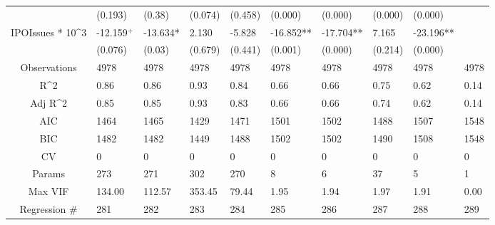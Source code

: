 \documentclass{article}
\begin{document}
\begin{table}[H]
\begin{tabular}{|clllllllll|}
   & (0.193) & (0.38) & (0.074) & (0.458) & (0.000) & (0.000) & (0.000) & (0.000) &  \\ 
  IPOIssues * 10^3 & -12.159$^{+}$ & -13.634* & 2.130 & -5.828 & -16.852** & -17.704** & 7.165 & -23.196** &  \\ 
   & (0.076) & (0.03) & (0.679) & (0.441) & (0.001) & (0.000) & (0.214) & (0.000) &  \\ 
  \hline 
 Observations & 4978 & 4978 & 4978 & 4978 & 4978 & 4978 & 4978 & 4978 & 4978 \\ 
  R^2 & 0.86 & 0.86 & 0.93 & 0.84 & 0.66 & 0.66 & 0.75 & 0.62 & 0.14 \\ 
  Adj R^2 & 0.85 & 0.85 & 0.93 & 0.83 & 0.66 & 0.66 & 0.74 & 0.62 & 0.14 \\ 
  AIC & 1464 & 1465 & 1429 & 1471 & 1501 & 1502 & 1488 & 1507 & 1548 \\ 
  BIC & 1482 & 1482 & 1449 & 1488 & 1502 & 1502 & 1490 & 1508 & 1548 \\ 
  CV & 0 & 0 & 0 & 0 & 0 & 0 & 0 & 0 & 0 \\ 
  Params & 273 & 271 & 302 & 270 & 8 & 6 & 37 & 5 & 1 \\ 
  Max VIF & 134.00 & 112.57 & 353.45 & 79.44 & 1.95 & 1.94 & 1.97 & 1.91 & 0.00 \\ 
  Regression \# & 281 & 282 & 283 & 284 & 285 & 286 & 287 & 288 & 289 \\ 
   \hline
\end{tabular}
 
\end{table}
\end{document}
